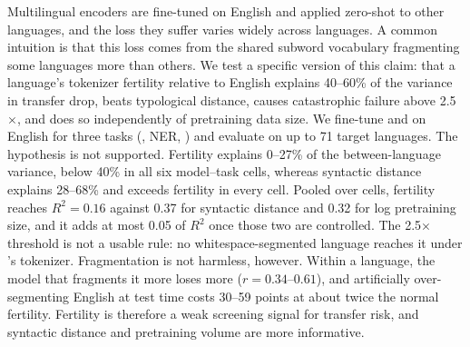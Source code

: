 Multilingual encoders are fine-tuned on English and applied zero-shot to other languages, and the loss they suffer varies widely across languages.
A common intuition is that this loss comes from the shared subword vocabulary fragmenting some languages more than others.
We test a specific version of this claim: that a language's tokenizer fertility relative to English explains 40--60\% of the variance in transfer drop, beats typological distance, causes catastrophic failure above 2.5$\times$, and does so independently of pretraining data size.
We fine-tune \mbert and \xlmr on English for three tasks (\xnli, \wikiann NER, \sib) and evaluate on up to 71 target languages.
The hypothesis is not supported.
Fertility explains 0--27\% of the between-language variance, below 40\% in all six model--task cells, whereas syntactic distance explains 28--68\% and exceeds fertility in every cell.
Pooled over cells, fertility reaches $R^2=0.16$ against 0.37 for syntactic distance and 0.32 for log pretraining size, and it adds at most 0.05 of $R^2$ once those two are controlled.
The 2.5$\times$ threshold is not a usable rule: no whitespace-segmented language reaches it under \xlmr's tokenizer.
Fragmentation is not harmless, however.
Within a language, the model that fragments it more loses more ($r=0.34$--$0.61$), and artificially over-segmenting English at test time costs 30--59 points at about twice the normal fertility.
Fertility is therefore a weak screening signal for transfer risk, and syntactic distance and pretraining volume are more informative.
